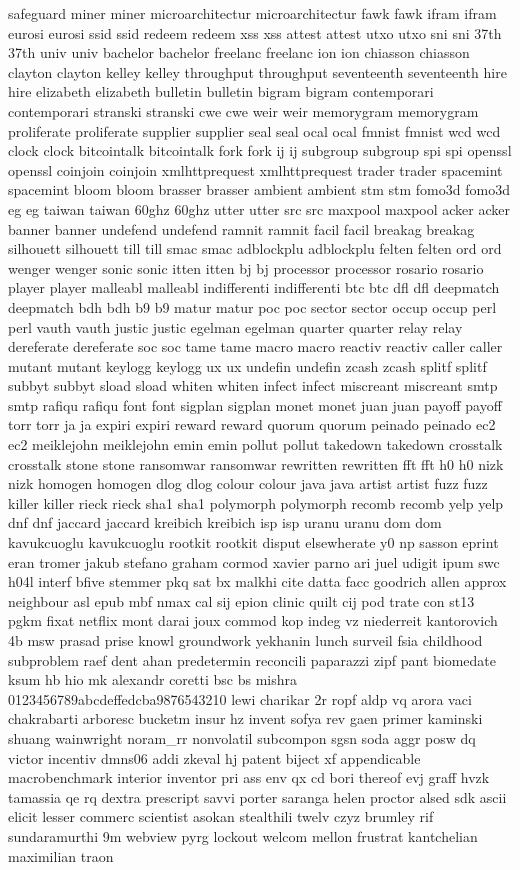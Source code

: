 \documentclass[conference]{IEEEtran}
\begin{document}
safeguard miner miner microarchitectur microarchitectur fawk fawk ifram ifram eurosi eurosi ssid ssid redeem redeem xss xss attest attest utxo utxo sni sni 37th 37th univ univ bachelor bachelor freelanc freelanc ion ion chiasson chiasson clayton clayton kelley kelley throughput throughput seventeenth seventeenth hire hire elizabeth elizabeth bulletin bulletin bigram bigram contemporari contemporari stranski stranski cwe cwe weir weir memorygram memorygram proliferate proliferate supplier supplier seal seal ocal ocal fmnist fmnist wcd wcd clock clock bitcointalk bitcointalk fork fork ij ij subgroup subgroup spi spi openssl openssl coinjoin coinjoin xmlhttprequest xmlhttprequest trader trader spacemint spacemint bloom bloom brasser brasser ambient ambient stm stm fomo3d fomo3d eg eg taiwan taiwan 60ghz 60ghz utter utter src src maxpool maxpool acker acker banner banner undefend undefend ramnit ramnit facil facil breakag breakag silhouett silhouett till till smac smac adblockplu adblockplu felten felten ord ord wenger wenger sonic sonic itten itten bj bj processor processor rosario rosario player player malleabl malleabl indifferenti indifferenti btc btc dfl dfl deepmatch deepmatch bdh bdh b9 b9 matur matur poc poc sector sector occup occup perl perl vauth vauth justic justic egelman egelman quarter quarter relay relay dereferate dereferate soc soc tame tame macro macro reactiv reactiv caller caller mutant mutant keylogg keylogg ux ux undefin undefin zcash zcash splitf splitf subbyt subbyt sload sload whiten whiten infect infect miscreant miscreant smtp smtp rafiqu rafiqu font font sigplan sigplan monet monet juan juan payoff payoff torr torr ja ja expiri expiri reward reward quorum quorum peinado peinado ec2 ec2 meiklejohn meiklejohn emin emin pollut pollut takedown takedown crosstalk crosstalk stone stone ransomwar ransomwar rewritten rewritten fft fft h0 h0 nizk nizk homogen homogen dlog dlog colour colour java java artist artist fuzz fuzz killer killer rieck rieck sha1 sha1 polymorph polymorph recomb recomb yelp yelp dnf dnf jaccard jaccard kreibich kreibich isp isp uranu uranu dom dom kavukcuoglu kavukcuoglu rootkit rootkit disput elsewherate y0 np sasson eprint eran tromer jakub stefano graham cormod xavier parno ari juel udigit ipum swc h04l interf bfive stemmer pkq sat bx malkhi cite datta facc goodrich allen approx neighbour asl epub mbf nmax cal sij epion clinic quilt cij pod trate con st13 pgkm fixat netflix mont darai joux commod kop indeg vz niederreit kantorovich 4b msw prasad prise knowl groundwork yekhanin lunch surveil fsia childhood subproblem raef dent ahan predetermin reconcili paparazzi zipf pant biomedate ksum hb hio mk alexandr coretti bsc bs mishra 0123456789abcdeffedcba9876543210 lewi charikar 2r ropf aldp vq arora vaci chakrabarti arboresc bucketm insur hz invent sofya rev gaen primer kaminski shuang wainwright noram_rr nonvolatil subcompon sgsn soda aggr posw dq victor incentiv dmns06 addi zkeval hj patent biject xf appendicable macrobenchmark interior inventor pri ass env qx cd bori thereof evj graff hvzk tamassia qe rq dextra prescript savvi porter saranga helen proctor alsed sdk ascii elicit lesser commerc scientist asokan stealthili twelv czyz brumley rif sundaramurthi 9m webview pyrg lockout welcom mellon frustrat kantchelian maximilian traon 
\end{document}
